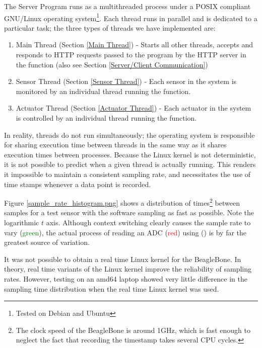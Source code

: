 The Server Program runs as a multithreaded process under a POSIX compliant GNU/Linux operating system\footnote{Tested on Debian and Ubuntu}. Each thread runs in parallel and is dedicated to a particular task; the three types of threads we have implemented are:
\begin{enumerate}
  \item Main Thread (Section \ref{Main Thread}) - Starts all other threads, accepts and responds to HTTP requests passed to the program by the HTTP server in the  function (also see Section \ref{Server/Client Communication})
  \item Sensor Thread (Section \ref{Sensor Thread}) - Each sensor in the system is monitored by an individual thread running the  function.
  \item Actuator Thread (Section \ref{Actuator Thread}) - Each actuator in the system is controlled by an individual thread running the  function.
\end{enumerate}


In reality, threads do not run simultaneously; the operating system is responsible for sharing execution time between threads in the same way as it shares execution times between processes. Because the Linux kernel is not deterministic, it is not possible to predict when a given thread is actually running. This renders it impossible to maintain a consistent sampling rate, and necessitates the use of time stamps whenever a data point is recorded. 

Figure \ref{sample_rate_histogram.png} shows a distribution of times\footnote{The clock speed of the BeagleBone is around 1GHz\cite{bbb_specs}, which is fast enough to neglect the fact that recording the timestamp takes several CPU cycles.} between samples for a test sensor with the software sampling as fast as possible. Note the logarithmic $t$ axis. Although context switching clearly causes the sample rate to vary (\textcolor{green}{green}), the actual process of reading an ADC (\textcolor{red}{red}) using  () is by far the greatest source of variation.

It was not possible to obtain a real time Linux kernel for the BeagleBone. In theory, real time variants of the Linux kernel improve the reliability of sampling rates. However, testing on an amd64 laptop showed very little difference in the sampling time distribution when the real time Linux kernel was used.


